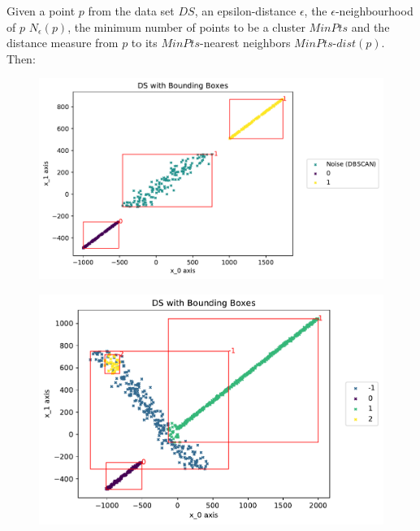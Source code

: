 Given a point $p$ from the data set $DS$, an epsilon-distance $\epsilon$, the  $\epsilon$-neighbourhood of $p$ $N_{\epsilon}(p)$, the minimum number of points to be a cluster $MinPts$ and the distance measure from $p$ to its $MinPts$-nearest neighbors $MinPts$-$dist(p)$. Then:
\begin{figure}
    \centering
    \begin{minipage}{.54\textwidth}
      \centering
      \includegraphics[width=.95\textwidth]{figures/DSwithDBSCANbadBoundingBoxes.pdf}
      \captionsetup{width=0.8\linewidth}
      \label{fig:baddbscan}
    \end{minipage}%
    \begin{minipage}{.46\textwidth}
      \centering
      \includegraphics[width=.95\textwidth]{figures/DSwithOPTICSBoundingBoxes.pdf}
      \captionsetup{width=0.9\linewidth}
      \label{fig:goodoptics}
    \end{minipage}
\end{figure}

